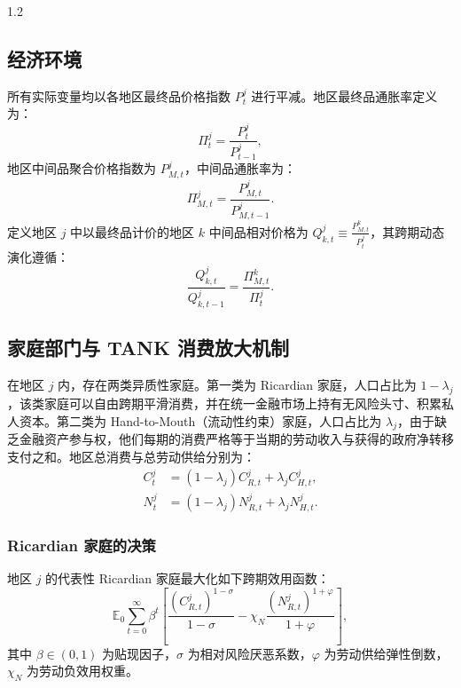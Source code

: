 \documentclass[12pt,UTF8]{ctexart}
\newcommand{\E}{\mathbb{E}}
\begin{document}
\begin{spacing}{1.2}
		\subsection{经济环境}
		
		所有实际变量均以各地区最终品价格指数 $P_t^j$ 进行平减。地区最终品通胀率定义为：
		\begin{equation}
			\Pi_t^j=\frac{P_t^j}{P_{t-1}^j},
		\end{equation}
		地区中间品聚合价格指数为 $P_{M,t}^j$，中间品通胀率为：
		\begin{equation}
			\Pi_{M,t}^j=\frac{P_{M,t}^j}{P_{M,t-1}^j}.
		\end{equation}
		定义地区 $j$ 中以最终品计价的地区 $k$ 中间品相对价格为 $Q_{k,t}^j\equiv \frac{P_{M,t}^k}{P_t^j}$，其跨期动态演化遵循：
		\begin{equation}
			\frac{Q_{k,t}^j}{Q_{k,t-1}^j}=\frac{\Pi_{M,t}^k}{\Pi_t^j}.
			\label{eq:q_law}
		\end{equation}
		
		\subsection{家庭部门与 TANK 消费放大机制}
		
		在地区 $j$ 内，存在两类异质性家庭。第一类为 Ricardian 家庭，人口占比为 $1-\lambda_j$，该类家庭可以自由跨期平滑消费，并在统一金融市场上持有无风险头寸、积累私人资本。第二类为 Hand-to-Mouth（流动性约束）家庭，人口占比为 $\lambda_j$，由于缺乏金融资产参与权，他们每期的消费严格等于当期的劳动收入与获得的政府净转移支付之和。地区总消费与总劳动供给分别为：
		\begin{align}
			C_t^j&=(1-\lambda_j)C_{R,t}^j+\lambda_j C_{H,t}^j, \label{eq:C_agg}\\
			N_t^j&=(1-\lambda_j)N_{R,t}^j+\lambda_j N_{H,t}^j.
			\label{eq:N_agg}
		\end{align}
		
		\subsubsection{Ricardian 家庭的决策}
		
		地区 $j$ 的代表性 Ricardian 家庭最大化如下跨期效用函数：
		\begin{equation}
			\E_0\sum_{t=0}^{\infty}\beta^t
			\left[
			\frac{(C_{R,t}^j)^{1-\sigma}}{1-\sigma}
			-\chi_N\frac{(N_{R,t}^j)^{1+\varphi}}{1+\varphi}
			\right],
		\end{equation}
		其中 $\beta \in (0,1)$ 为贴现因子，$\sigma$ 为相对风险厌恶系数，$\varphi$ 为劳动供给弹性倒数，$\chi_N$ 为劳动负效用权重。
		

\end{spacing}
\end{document}

